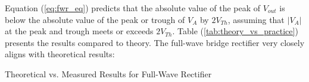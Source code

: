 \FloatBarrier

Equation (\ref{eq:fwr_eq}) predicts that the absolute value of the peak of $V_{out}$ is below the absolute value of the peak or trough of $V_{A}$ by $2V_{Th}$, assuming that $|V_{A}|$ at the peak and trough meets or exceeds $2V_{Th}$. Table (\ref{tab:theory_vs_practice}) presents the results compared to theory. The full-wave bridge rectifier very closely aligns with theoretical results:

\FloatBarrier

\begin{table}[h!]
	\centering
	\caption{Theoretical vs. Measured Results for Full-Wave Rectifier}
	\label{tab:theory_vs_practice}
\end{table}

\FloatBarrier
